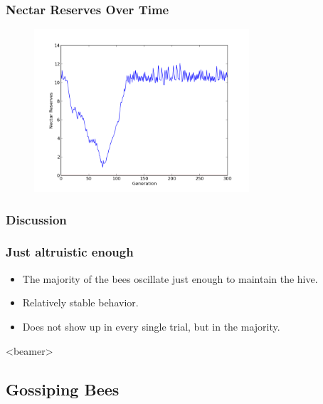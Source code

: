 \documentclass{beamer}
\begin{document}
        \begin{frame}[t]\frametitle{Nectar Reserves Over Time}
          \begin{figure}
          \includegraphics[width=8cm]{results/recurrent_bees_nectar.png}
          \end{figure}
        \end{frame}

      \subsubsection{Discussion} %
      \label{ssub:discussion}
        \begin{frame}[c]\frametitle{Just altruistic enough}
            
          \begin{itemize}
            \item The majority of the bees oscillate just enough to maintain 
                  the hive.
            \item Relatively stable behavior.
            \item Does not show up in every single trial, but in the majority.
          \end{itemize}
        
        \end{frame}


    \setcounter{tocdepth}{2}
    \begin{frame}<beamer>
    \end{frame}
    \setcounter{tocdepth}{3}


    \subsection{Gossiping Bees} %
    \label{sub:gossipping_bees}
    
\end{document}
